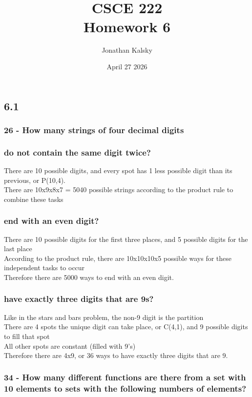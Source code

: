 \documentclass{article}
\author{Jonathan Kalsky}
\date{April 27 2026}
\title{\normalsize CSCE 222\\ \Large Homework 6}
\begin{document}
\maketitle
\tableofcontents
\vspace{1cm}

\subsection{6.1}
\subsubsection*{26 - How many strings of four decimal digits}
\subsubsection[26a]{do not contain the same digit twice?}
There are 10 possible digits, and every spot has 1 less possible digit than its previous, or P(10,4).\\
There are 10x9x8x7 = 5040 possible strings according to the product rule to combine these tasks
\subsubsection[26b]{end with an even digit?}
There are 10 possible digits for the first three places, and 5 possible digits for the last place\\
According to the product rule, there are 10x10x10x5 possible ways for these independent tasks to occur\\
Therefore there are 5000 ways to end with an even digit.
\subsubsection[26c]{have exactly three digits that are 9s?}
Like in the stars and bars problem, the non-9 digit is the partition\\
There are 4 spots the unique digit can take place, or C(4,1), and 9 possible digits to fill that spot\\
All other spots are constant (filled with 9's)\\
Therefore there are 4x9, or 36 ways to have exactly three digits that are 9.
\subsubsection*{34 - How many different functions are there from a set with 10 elements to sets with the following numbers of elements?}
\end{document}
